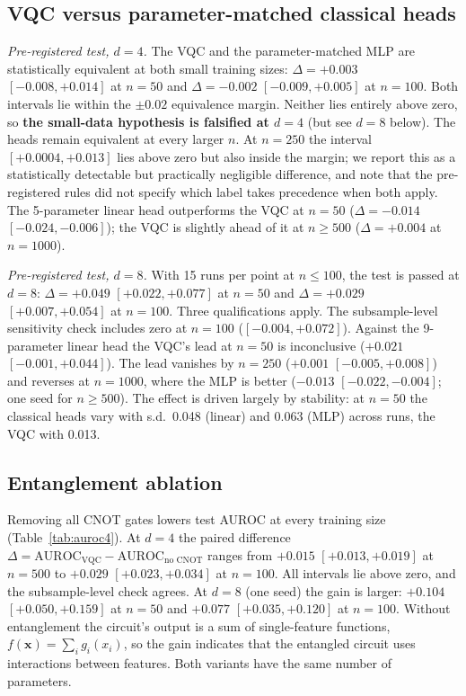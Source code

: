 \documentclass[conference]{IEEEtran}
\begin{document}
\subsection{VQC versus parameter-matched classical heads}
\emph{Pre-registered test, $d=4$.} The VQC and the parameter-matched MLP
are statistically equivalent at both small training sizes:
$\Delta=+0.003$ $[-0.008,+0.014]$ at $n=50$ and $\Delta=-0.002$
$[-0.009,+0.005]$ at $n=100$. Both intervals lie within the $\pm0.02$
equivalence margin. Neither lies entirely above zero, so \textbf{the
small-data hypothesis is falsified at $d=4$} (but see $d=8$ below). The
heads remain equivalent at every larger $n$. At $n=250$ the interval
$[+0.0004,+0.013]$ lies above zero but also inside the margin; we report
this as a statistically detectable but practically negligible difference,
and note that the pre-registered rules did not specify which label takes
precedence when both apply. The 5-parameter linear head outperforms the
VQC at $n=50$ ($\Delta=-0.014$ $[-0.024,-0.006]$); the VQC is slightly
ahead of it at $n\ge500$ ($\Delta=+0.004$ at $n=1000$).

\emph{Pre-registered test, $d=8$.} With 15 runs per point at $n\le100$,
the test is passed at $d=8$: $\Delta=+0.049$ $[+0.022,+0.077]$ at $n=50$
and $\Delta=+0.029$ $[+0.007,+0.054]$ at $n=100$. Three qualifications
apply. The subsample-level sensitivity check includes zero at $n=100$
($[-0.004,+0.072]$). Against the 9-parameter linear head the VQC's lead at
$n=50$ is inconclusive ($+0.021$ $[-0.001,+0.044]$). The lead vanishes by
$n=250$ ($+0.001$ $[-0.005,+0.008]$) and reverses at $n=1000$, where the
MLP is better ($-0.013$ $[-0.022,-0.004]$; one seed for $n\ge500$). The
effect is driven largely by stability: at $n=50$ the classical heads vary
with s.d.\ 0.048 (linear) and 0.063 (MLP) across runs, the VQC with 0.013.

\subsection{Entanglement ablation}
Removing all CNOT gates lowers test AUROC at every training size
(Table~\ref{tab:auroc4}). At $d=4$ the paired difference
$\Delta=\mathrm{AUROC}_{\mathrm{VQC}}-\mathrm{AUROC}_{\text{no CNOT}}$
ranges from $+0.015$ $[+0.013,+0.019]$ at $n=500$ to $+0.029$
$[+0.023,+0.034]$ at $n=100$. All intervals lie above zero, and the
subsample-level check agrees. At $d=8$ (one seed) the gain is larger:
$+0.104$ $[+0.050,+0.159]$ at $n=50$ and $+0.077$ $[+0.035,+0.120]$ at
$n=100$. Without entanglement the circuit's output is a sum of
single-feature functions, $f(\mathbf{x})=\sum_i g_i(x_i)$, so the gain
indicates that the entangled circuit uses interactions between features.
Both variants have the same number of parameters.
\end{document}
